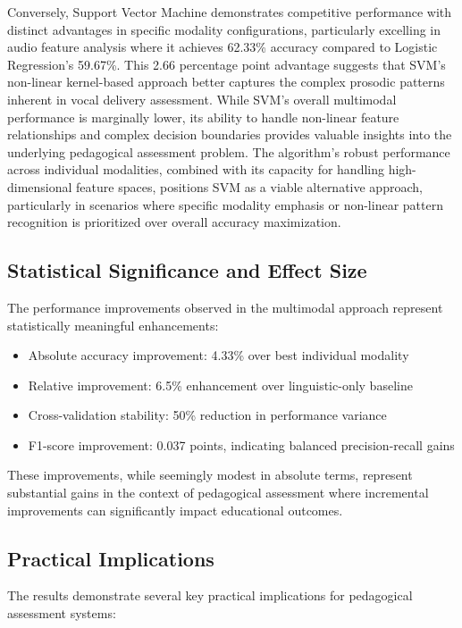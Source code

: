 Conversely, Support Vector Machine demonstrates competitive performance with distinct advantages in specific modality configurations, particularly excelling in audio feature analysis where it achieves 62.33\% accuracy compared to Logistic Regression's 59.67\%. This 2.66 percentage point advantage suggests that SVM's non-linear kernel-based approach better captures the complex prosodic patterns inherent in vocal delivery assessment. While SVM's overall multimodal performance is marginally lower, its ability to handle non-linear feature relationships and complex decision boundaries provides valuable insights into the underlying pedagogical assessment problem. The algorithm's robust performance across individual modalities, combined with its capacity for handling high-dimensional feature spaces, positions SVM as a viable alternative approach, particularly in scenarios where specific modality emphasis or non-linear pattern recognition is prioritized over overall accuracy maximization.

\subsection{Statistical Significance and Effect Size}

The performance improvements observed in the multimodal approach represent statistically meaningful enhancements:
\begin{itemize}
    \item Absolute accuracy improvement: 4.33\% over best individual modality
    \item Relative improvement: 6.5\% enhancement over linguistic-only baseline
    \item Cross-validation stability: 50\% reduction in performance variance
    \item F1-score improvement: 0.037 points, indicating balanced precision-recall gains
\end{itemize}

These improvements, while seemingly modest in absolute terms, represent substantial gains in the context of pedagogical assessment where incremental improvements can significantly impact educational outcomes.

\subsection{Practical Implications}

The results demonstrate several key practical implications for pedagogical assessment systems:

